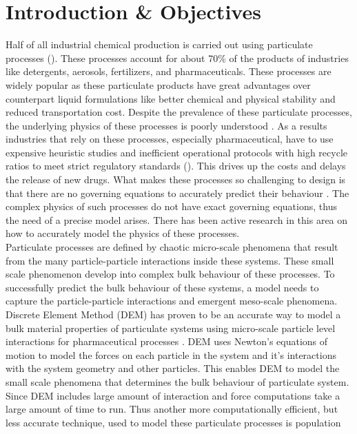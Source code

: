 \documentclass[preprint,11pt,authoryear]{elsarticle}
\begin{document}
\section{Introduction \& Objectives} 
Half of all industrial chemical production is carried out using particulate processes 
(\cite{seville1997}). These processes account for about 70\% of the products 
of industries like detergents, aerosols, fertilizers, and pharmaceuticals\citep{Litster2016}. 
These processes are widely popular as these particulate products have great advantages over 
counterpart liquid formulations like better chemical and physical stability and reduced 
transportation cost. Despite the prevalence of these particulate processes, the underlying 
physics of these processes is poorly understood \citep{Rogers2013}. As a results industries 
that rely on these processes, especially pharmaceutical, have to use expensive 
heuristic studies and inefficient operational protocols with high recycle ratios to meet strict 
regulatory standards (\cite{Ramachandran2009}). This drives up the costs and delays the release of 
new drugs. What makes these processes so challenging to design is that there are no governing 
equations to accurately predict their behaviour \citep{sen2013}. The complex physics of such 
processes do not have exact governing equations, thus the need of a precise model arises. There 
has been active research in this area on how to accurately model the  physics of these processes.\\
Particulate processes are defined by chaotic micro-scale phenomena that result from the many 
particle-particle interactions inside these systems. These small scale phenomenon develop into 
complex bulk behaviour of these processes. To successfully predict the bulk behaviour of these 
systems, a model needs to capture the particle-particle interactions and emergent meso-scale phenomena. Discrete Element Method (DEM)\citep{Cundall1979} has proven to be an accurate way 
to  model a bulk material properties of particulate systems using micro-scale particle level 
interactions for pharmaceutical processes \citep{Hancock2011}. DEM uses Newton's equations of 
motion to model the forces on each particle in the system and it's interactions with the system 
geometry and other particles. This enables DEM to model the small scale phenomena that 
determines the bulk behaviour of particulate system. Since DEM includes large amount of interaction 
and force computations take a large amount of time to run. Thus another more computationally 
efficient, but less accurate technique, used to model these particulate processes is population 
\end{document}
